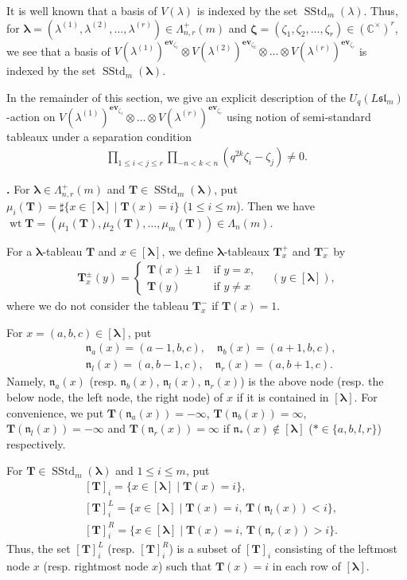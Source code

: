 \documentclass[12pt]{amsart}
\def \para{\refstepcounter{thm} \par\medskip\noindent
                \textbf{\thethm .} }
\numberwithin{equation}{thm}
\newcommand\CC{\mathbb C}
\newcommand\bT{\mathbf T}
\newcommand\fn{\mathfrak n}
\newcommand\z{\zeta}
\newcommand\la{\lambda}
\newcommand\vL{\varLambda}
\newcommand\Bz{\boldsymbol\zeta}
\newcommand\Bla{\boldsymbol\lambda}
\newcommand{\owt}{\operatorname{wt}}
\newcommand\Fsl{\mathfrak{sl}}
\newcommand\ev{\mathbf{{ev}}}
\newcommand{\SStd}{\operatorname{SStd}}
\newcounter{ni}
\begin{document}
It is well known that a basis of $V(\la)$ is indexed by the set $\SStd_m(\la)$. 
Thus, for $\Bla =(\la^{(1)}, \la^{(2)}, \dots, \la^{(r)}) \in \vL_{n,r}^+(m)$ and $\Bz =(\z_1, \z_2,\dots, \z_r) \in (\CC^{\times})^r$,  
we see that a basis of $V(\la^{(1)})^{\ev_{\z_1}} \otimes V(\la^{(2)})^{\ev_{\z_2}} \otimes \dots \otimes V (\la^{(r)})^{\ev_{\z_r}}$ 
is indexed by the set $\SStd_m (\Bla)$. 

In the remainder of this section, 
we give an explicit description of  the $U_q (L\Fsl_m)$-action on 
$V(\la^{(1)})^{\ev_{\z_1}} \otimes \dots \otimes V (\la^{(r)})^{\ev_{\z_r}}$ 
using notion of semi-standard tableaux under a separation condition 
\begin{align}
\label{separation cond} 
\prod_{1 \leq i < j \leq r} \prod_{ - n < k < n} (q^{2k} \z_i - \z_j) \not=0.
\end{align}

\para \label{bTi} 
For $\Bla \in \vL_{n,r}^+(m)$ and $\bT \in \SStd_m(\Bla)$, 
put $\mu_i (\bT) = \sharp \{ x \in [\Bla] \mid \bT(x) =i\}$  ($1\leq i \leq m$). 
Then we have  $\owt \bT =(\mu_1(\bT), \mu_2(\bT), \dots, \mu_m(\bT)) \in \vL_n(m)$. 

For a $\Bla$-tableau $\bT$ and $x \in [\Bla]$, 
we define $\Bla$-tableaux $\bT_x^+$ and $\bT_x^-$ by  
\begin{align*}
\bT_x^{\pm} (y) = \begin{cases} \bT(x) \pm 1 & \text{ if } y=x, \\ \bT(y) & \text{ if } y \not=x \end{cases} 
\quad (y \in [\Bla]), 
\end{align*}
where we do not consider the tableau $\bT_x^-$ if $\bT(x) =1$. 

For $x=(a,b,c) \in [\Bla]$, put 
\begin{align*}
&\fn_a (x) = (a-1, b,c), 
\quad 
\fn_b (x) = (a+1,b,c), 
\\
&\fn_l (x) = (a, b-1,c), 
\quad 
\fn_r (x) = (a, b+1,c). 
\end{align*}
Namely, $\fn_a(x)$ (resp. $\fn_b(x)$, $\fn_l(x)$, $\fn_r(x)$) is the above node 
(resp. the below node, the left node, the right node) of $x$ if it is contained in $[\Bla]$. 
For convenience, we put 
$\bT( \fn_a(x)) = - \infty$, $\bT (\fn_b (x)) = \infty$, $\bT(\fn_l(x)) = - \infty$ and $\bT ( \fn_r(x)) = \infty$ 
if $\fn_{*} (x) \not\in [\Bla]$ ($* \in \{a,b,l,r\}$) respectively.  

For $\bT \in \SStd_m(\Bla)$ and $1 \leq i \leq m$, put 
\begin{align*}
& [\bT]_i = \{ x \in [\Bla] \mid \bT(x) =i\}, 
\\
& [\bT]_i^L = \{ x \in [\Bla] \mid \bT (x) =i, \, \bT(\fn_l(x)) <i\}, 
\\
& [\bT]_i^R = \{ x \in [\Bla] \mid \bT(x) =i, \, \bT(\fn_r(x)) >i\}. 
\end{align*}
Thus, the set 
$[\bT]_i^L$ (resp. $[\bT]_i^R$) 
is a subset of $[\bT]_i$ consisting of the leftmost node $x$ (resp. rightmost node $x$) such that $\bT(x) =i$ 
in each row of $[\Bla]$. 
\end{document}
